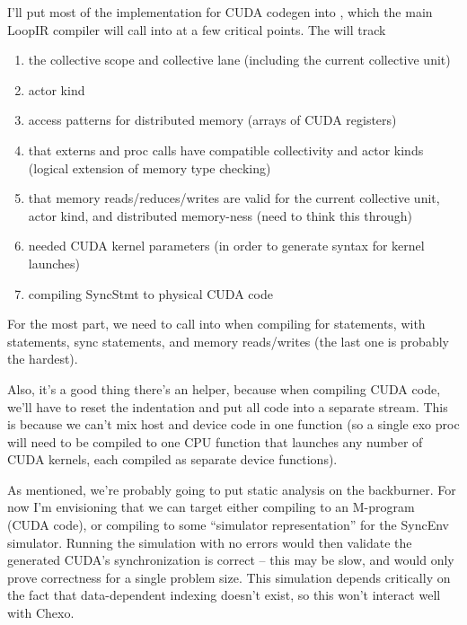 \filbreak
{}

I'll put most of the implementation for CUDA codegen into , which the main LoopIR compiler will call into at a few critical points.
The  will track
\begin{enumerate}
  \item the collective scope and collective lane (including the current collective unit)
  \item actor kind
  \item access patterns for distributed memory (arrays of CUDA registers)
  \item that externs and proc calls have compatible collectivity and actor kinds (logical extension of memory type checking)
  \item that memory reads/reduces/writes are valid for the current collective unit, actor kind, and distributed memory-ness (need to think this through)
  \item needed CUDA kernel parameters (in order to generate syntax for kernel launches)
  \item compiling SyncStmt to physical CUDA code
\end{enumerate}

\filbreak
For the most part, we need to call into  when compiling for statements, with statements, sync statements, and memory reads/writes (the last one is probably the hardest).

\filbreak
Also, it's a good thing there's an  helper, because when compiling CUDA code, we'll have to reset the indentation and put all code into a separate stream.
This is because we can't mix host and device code in one function (so a single exo proc will need to be compiled to one CPU function that launches any number of CUDA kernels, each compiled as separate device functions).

\filbreak
{}

As mentioned, we're probably going to put static analysis on the backburner.
For now I'm envisioning that we can target either compiling to an M-program (CUDA code), or compiling to some ``simulator representation'' for the SyncEnv simulator.
Running the simulation with no errors would then validate the generated CUDA's synchronization is correct -- this may be slow, and would only prove correctness for a single problem size.
This simulation depends critically on the fact that data-dependent indexing doesn't exist, so this won't interact well with Chexo.

